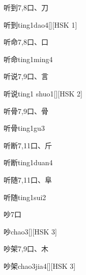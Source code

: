 \begin{entry}{听到}{7,8}{⼝、⼑}
  \begin{phonetics}{听到}{ting1dao4}[][HSK 1]
  \end{phonetics}
\end{entry}

\begin{entry}{听命}{7,8}{⼝、⼝}
  \begin{phonetics}{听命}{ting1ming4}
  \end{phonetics}
\end{entry}

\begin{entry}{听说}{7,9}{⼝、⾔}
  \begin{phonetics}{听说}{ting1 shuo1}[][HSK 2]
  \end{phonetics}
\end{entry}

\begin{entry}{听骨}{7,9}{⼝、⾻}
  \begin{phonetics}{听骨}{ting1gu3}
  \end{phonetics}
\end{entry}

\begin{entry}{听断}{7,11}{⼝、⽄}
  \begin{phonetics}{听断}{ting1duan4}
  \end{phonetics}
\end{entry}

\begin{entry}{听随}{7,11}{⼝、⾩}
  \begin{phonetics}{听随}{ting1sui2}
  \end{phonetics}
\end{entry}

\begin{entry}{吵}{7}{⼝}
  \begin{phonetics}{吵}{chao3}[][HSK 3]
  \end{phonetics}
\end{entry}

\begin{entry}{吵架}{7,9}{⼝、⽊}
  \begin{phonetics}{吵架}{chao3jia4}[][HSK 3]
  \end{phonetics}
\end{entry}


